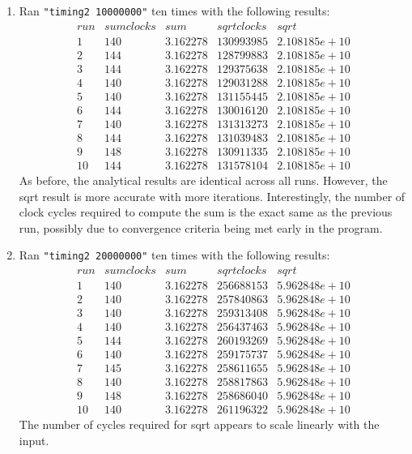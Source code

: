 \documentclass[12pt,fleqn,leqno,letterpaper]{article}
\begin{document}
\begin{enumerate}
    \item Ran \texttt{"timing2 10000000"} ten times with the following
        results:\\
        $$
        \begin{array}{lcccc}
            run & sum clocks & sum & sqrt clocks & sqrt \\
            1 & 140 & 3.162278 & 130993985 & 2.108185e+10 \\
            2 & 144 & 3.162278 & 128799883 & 2.108185e+10 \\
            3 & 144 & 3.162278 & 129375638 & 2.108185e+10 \\
            4 & 140 & 3.162278 & 129031288 & 2.108185e+10 \\
            5 & 140 & 3.162278 & 131155445 & 2.108185e+10 \\
            6 & 144 & 3.162278 & 130016120 & 2.108185e+10 \\
            7 & 140 & 3.162278 & 131313273 & 2.108185e+10 \\
            8 & 144 & 3.162278 & 131039483 & 2.108185e+10 \\
            9 & 148 & 3.162278 & 130911335 & 2.108185e+10 \\
            10 & 144 & 3.162278 & 131578104 & 2.108185e+10
        \end{array}
        $$
        As before, the analytical results are identical across all runs.
        However, the sqrt result is more accurate with more iterations.
        Interestingly, the number of clock cycles required to compute the sum is
        the exact same as the previous run, possibly due to convergence criteria
        being met early in the program.

    \item Ran \texttt{"timing2 20000000"} ten times with the following
        results:\\
        $$
        \begin{array}{lcccc}
            run & sum clocks & sum & sqrt clocks & sqrt \\
            1 & 140 & 3.162278 & 256688153 & 5.962848e+10 \\
            2 & 140 & 3.162278 & 257840863 & 5.962848e+10 \\
            3 & 140 & 3.162278 & 259313408 & 5.962848e+10 \\
            4 & 140 & 3.162278 & 256437463 & 5.962848e+10 \\
            5 & 144 & 3.162278 & 260193269 & 5.962848e+10 \\
            6 & 140 & 3.162278 & 259175737 & 5.962848e+10 \\
            7 & 145 & 3.162278 & 258611655 & 5.962848e+10 \\
            8 & 140 & 3.162278 & 258817863 & 5.962848e+10 \\
            9 & 148 & 3.162278 & 258686040 & 5.962848e+10 \\
            10 & 140 & 3.162278 & 261196322 & 5.962848e+10
        \end{array}
        $$
        The number of cycles required for sqrt appears to scale linearly with
        the input.

\end{enumerate}


% 
\end{document}
